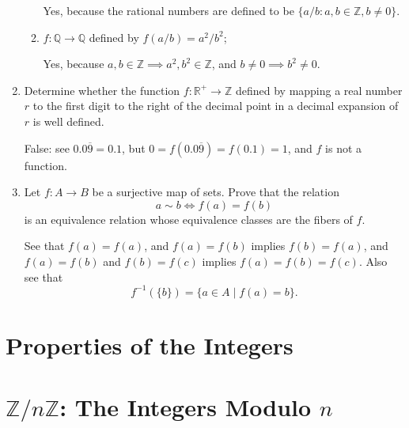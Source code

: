 \begin{enumerate}
\begin{enumerate}
        Yes, because the rational numbers are defined to be $\{a/b:a,b\in\mathbb{Z}, b\neq0\}$.
        \item $f : \mathbb{Q} \to \mathbb{Q}$ defined by $f(a/b) = a^2/b^2$;
        
        Yes, because $a,b\in\mathbb{Z}\implies a^2,b^2\in\mathbb{Z}$, and $b\neq0\implies b^2\neq0$.
    \end{enumerate}
    \item Determine whether the function $f : \mathbb{R}^+ \to \mathbb{Z}$ defined by mapping a real number $r$ to the first digit to the right of the decimal point in a decimal expansion of $r$ is well defined.
    
    False: see $0.0\overline{9}=0.1$, but $0=f(0.0\overline{9})=f(0.1)=1$, and $f$ is not a function.
    \item Let $f: A \to B$ be a surjective map of sets. Prove that the relation
    \[
        a \sim b \iff f(a) = f(b)
    \]
    is an equivalence relation whose equivalence classes are the fibers of $f$.

    See that $f(a)=f(a)$, and $f(a)=f(b)$ implies $f(b)=f(a)$, and $f(a)=f(b)$ and $f(b)=f(c)$ implies $f(a)=f(b)=f(c)$.
    Also see that
    \[
        f^{-1}(\{b\})=\{a\in A\mid f(a)=b\}.
    \]
\end{enumerate}

\section{Properties of the Integers}

\section{$\mathbb{Z}/n\mathbb{Z}$: The Integers Modulo $n$}